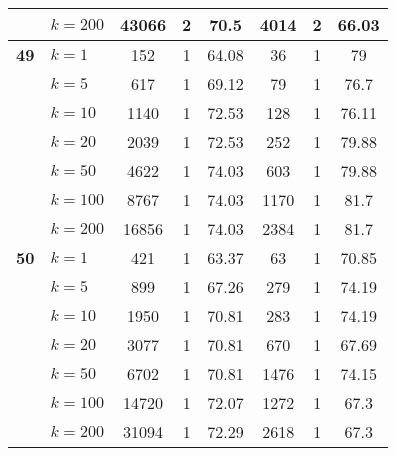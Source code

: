 \begin{table}[htbp]
\begin{tabular}{|l|l|c|c|c|c|c|c|}
     & $k=200$ & 43066 & 2 & 70.5 & 4014 & 2 & 66.03 \\ \hline
    \multicolumn{1}{|r|}{\textbf{49}} & $k=1$ & 152 & 1 & 64.08 & 36 & 1 & 79 \\ 
     & $k=5$ & 617 & 1 & 69.12 & 79 & 1 & 76.7 \\ 
     & $k=10$ & 1140 & 1 & 72.53 & 128 & 1 & 76.11 \\ 
     & $k=20$ & 2039 & 1 & 72.53 & 252 & 1 & 79.88 \\ 
     & $k=50$ & 4622 & 1 & 74.03 & 603 & 1 & 79.88 \\ 
     & $k=100$ & 8767 & 1 & 74.03 & 1170 & 1 & 81.7 \\ 
     & $k=200$ & 16856 & 1 & 74.03 & 2384 & 1 & 81.7 \\ \hline
    \multicolumn{1}{|r|}{\textbf{50}} & $k=1$ & 421 & 1 & 63.37 & 63 & 1 & 70.85 \\ 
     & $k=5$ & 899 & 1 & 67.26 & 279 & 1 & 74.19 \\ 
     & $k=10$ & 1950 & 1 & 70.81 & 283 & 1 & 74.19 \\ 
     & $k=20$ & 3077 & 1 & 70.81 & 670 & 1 & 67.69 \\ 
     & $k=50$ & 6702 & 1 & 70.81 & 1476 & 1 & 74.15 \\ 
     & $k=100$ & 14720 & 1 & 72.07 & 1272 & 1 & 67.3 \\ 
     & $k=200$ & 31094 & 1 & 72.29 & 2618 & 1 & 67.3 \\ \hline
    \end{tabular}
\end{table}
